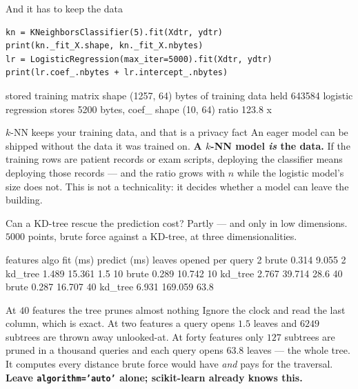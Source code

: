 \documentclass[aspectratio=169]{beamer}
\begin{document}
\begin{frame}[fragile,shrink=6]{And it has to keep the data}
\begin{lstlisting}
kn = KNeighborsClassifier(5).fit(Xdtr, ydtr)
print(kn._fit_X.shape, kn._fit_X.nbytes)
lr = LogisticRegression(max_iter=5000).fit(Xdtr, ydtr)
print(lr.coef_.nbytes + lr.intercept_.nbytes)
\end{lstlisting}
\begin{outblk}
stored training matrix shape (1257, 64)
bytes of training data held   643584
logistic regression stores    5200 bytes, coef_ shape (10, 64)
ratio 123.8 x
\end{outblk}
\begin{alertblock}{$k$-NN keeps your training data, and that is a privacy fact}
  \footnotesize An eager model can be shipped without the data it was trained
  on. \textbf{A $k$-NN model \emph{is} the data.} If the training rows are
  patient records or exam scripts, deploying the classifier means deploying
  those records --- and the ratio grows with $n$ while the logistic model's
  size does not. This is not a technicality: it decides whether a model can
  leave the building.
\end{alertblock}
\end{frame}

\begin{frame}[fragile,shrink=8]{Can a KD-tree rescue the prediction cost?}
Partly --- and only in low dimensions. $5000$ points, brute force against a
KD-tree, at three dimensionalities.
\begin{outblk}
features        algo     fit (ms)   predict (ms)   leaves opened per query
2              brute        0.314          9.055
2            kd_tree        1.489         15.361                       1.5
10             brute        0.289         10.742
10           kd_tree        2.767         39.714                      28.6
40             brute        0.287         16.707
40           kd_tree        6.931        169.059                      63.8
\end{outblk}
\begin{alertblock}{At $40$ features the tree prunes almost nothing}
  \footnotesize Ignore the clock and read the last column, which is exact.
  At two features a query opens $1.5$ leaves and $6249$ subtrees are thrown
  away unlooked-at. At forty features only $127$ subtrees are pruned in a
  thousand queries and each query opens $63.8$ leaves --- the whole tree. It
  computes every distance brute force would have \emph{and} pays for the
  traversal. \textbf{Leave \texttt{algorithm='auto'} alone; scikit-learn
  already knows this.}
\end{alertblock}
\end{frame}
\end{document}
